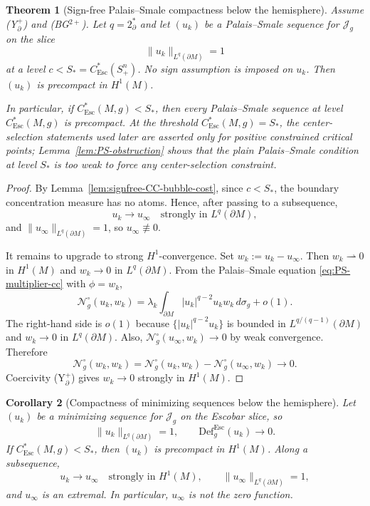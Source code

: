 \documentclass[11pt,reqno,a4paper]{amsart}
\numberwithin{equation}{section}
\newcommand{\Def}{\mathrm{Def}}
\theoremstyle{plain}
\newtheorem{theorem}{Theorem}[section]
\newtheorem{corollary}[theorem]{Corollary}
\newcommand{\Esc}{\ensuremath{\mathrm{Esc}}}
\theoremstyle{remark}
\theoremstyle{plain}
\begin{document}
\begin{theorem}[Sign-free Palais--Smale compactness below the hemisphere]
\label{thm:compactness-escobar}
Assume \textup{(Y$^+_{\partial}$)} and \textup{(BG$^{2+}$)}.  Let
$q=2^*_\partial$ and let $(u_k)$ be a Palais--Smale sequence for
$\mathcal J_g$ on the slice
\[
\|u_k\|_{L^q(\partial M)}=1
\]
at a level $c<S_\ast=C^*_{\Esc}(S^n_+)$.  No sign assumption is imposed on
$u_k$.  Then $(u_k)$ is precompact in $H^1(M)$.

In particular, if $C^*_{\Esc}(M,g)<S_\ast$, then every Palais--Smale sequence
at level $C^*_{\Esc}(M,g)$ is precompact.  At the threshold
$C^*_{\Esc}(M,g)=S_\ast$, the center-selection statements used later are
asserted only for positive constrained critical points;
Lemma~\ref{lem:PS-obstruction} shows that the plain Palais--Smale condition
at level $S_\ast$ is too weak to force any center-selection constraint.
\end{theorem}

\begin{proof}
By Lemma~\ref{lem:signfree-CC-bubble-cost}, since $c<S_\ast$, the boundary
concentration measure has no atoms.  Hence, after passing to a subsequence,
\[
u_k\to u_\infty\quad\text{strongly in }L^q(\partial M),
\]
and $\|u_\infty\|_{L^q(\partial M)}=1$, so $u_\infty\not\equiv0$.

It remains to upgrade to strong $H^1$-convergence.  Set $w_k:=u_k-u_\infty$.
Then $w_k\rightharpoonup0$ in $H^1(M)$ and $w_k\to0$ in $L^q(\partial M)$.
From the Palais--Smale equation \eqref{eq:PS-multiplier-cc} with
$\phi=w_k$,
\[
\mathcal N_g^\circ(u_k,w_k)
=\lambda_k\int_{\partial M}|u_k|^{q-2}u_kw_k\,d\sigma_g+o(1).
\]
The right-hand side is $o(1)$ because $\{|u_k|^{q-2}u_k\}$ is bounded in
$L^{q/(q-1)}(\partial M)$ and $w_k\to0$ in $L^q(\partial M)$.  Also,
$\mathcal N_g^\circ(u_\infty,w_k)\to0$ by weak convergence.  Therefore
\[
\mathcal N_g^\circ(w_k,w_k)
=\mathcal N_g^\circ(u_k,w_k)-\mathcal N_g^\circ(u_\infty,w_k)\to0.
\]
Coercivity \textup{(Y$^+_{\partial}$)} gives $w_k\to0$ strongly in $H^1(M)$.
\end{proof}

\begin{corollary}[Compactness of minimizing sequences below the hemisphere]
\label{cor:escobar-precompact-cov}
Let $(u_k)$ be a minimizing sequence for $\mathcal J_g$ on the Escobar slice,
so
\[
\|u_k\|_{L^q(\partial M)}=1,
\qquad
\Def^{\Esc}_g(u_k)\to0.
\]
If $C^*_{\Esc}(M,g)<S_\ast$, then $(u_k)$ is precompact in $H^1(M)$.  Along a
subsequence,
\[
u_k\to u_\infty\quad\text{strongly in }H^1(M),
\qquad
\|u_\infty\|_{L^q(\partial M)}=1,
\]
and $u_\infty$ is an extremal.  In particular, $u_\infty$ is not the zero
function.
\end{corollary}
\end{document}
